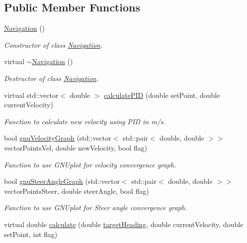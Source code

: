 \subsection*{Public Member Functions}
\begin{DoxyCompactItemize}
\item 
\hyperlink{class_navigation_a81fdffdefe46340da5fa6c570066b42b}{Navigation} ()
\begin{DoxyCompactList}\small\item\em Constructor of class \hyperlink{class_navigation}{Navigation}. \end{DoxyCompactList}\item 
virtual \hyperlink{class_navigation_addd4022d716df48f4e55a1db69361ba7}{$\sim$\+Navigation} ()
\begin{DoxyCompactList}\small\item\em Destructor of class \hyperlink{class_navigation}{Navigation}. \end{DoxyCompactList}\item 
virtual std\+::vector$<$ double $>$ \hyperlink{class_navigation_ae8fc8426c7277de0b34aec951fc28e2c}{calculate\+P\+ID} (double set\+Point, double current\+Velocity)
\begin{DoxyCompactList}\small\item\em Function to calculate new velocity using P\+ID in m/s. \end{DoxyCompactList}\item 
bool \hyperlink{class_navigation_a632e4d0d9be60dd775b4e57edb797073}{gnu\+Velocity\+Graph} (std\+::vector$<$ std\+::pair$<$ double, double $>$$>$ vector\+Points\+Vel, double new\+Velocity, bool flag)
\begin{DoxyCompactList}\small\item\em Function to use G\+N\+Uplot for velocity convergence graph. \end{DoxyCompactList}\item 
bool \hyperlink{class_navigation_ab35bfaf55fde4a16c05d88ef8789a947}{gnu\+Steer\+Angle\+Graph} (std\+::vector$<$ std\+::pair$<$ double, double $>$$>$ vector\+Points\+Steer, double steer\+Angle, bool flag)
\begin{DoxyCompactList}\small\item\em Function to use G\+N\+Uplot for Steer angle convergence graph. \end{DoxyCompactList}\item 
virtual double \hyperlink{class_navigation_a0f83b511cec12a68f2c3466c40c5d3cb}{calculate} (double \hyperlink{class_steer_algorithm_a071efeb53e86ee949940b0ab10986044}{target\+Heading}, double current\+Velocity, double set\+Point, int flag)

\end{DoxyCompactItemize}
